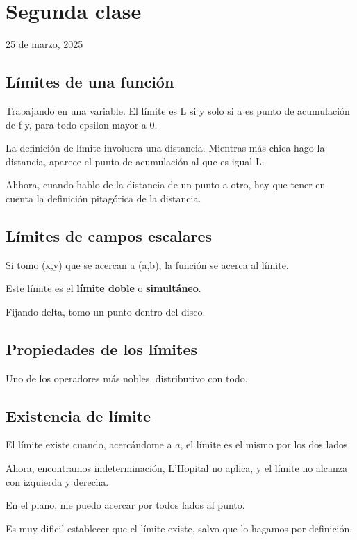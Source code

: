 \section{Segunda clase}

25 de marzo, 2025

\subsection{Límites de una función}

Trabajando en una variable.
El límite es L si y solo si a es punto de acumulación de f y,
para todo epsilon mayor a 0.

La definición de límite involucra una distancia.
Mientras más chica hago la distancia,
aparece el punto de acumulación al que es igual L.

Ahhora, cuando hablo de la distancia de un punto a otro, hay que tener en cuenta la definición pitagórica de la distancia.

\subsection{Límites de campos escalares}

Si tomo (x,y) que se acercan a (a,b),
la función se acerca al límite.

Este límite es el \textbf{límite doble} o \textbf{simultáneo}.

Fijando delta,
tomo un punto dentro del disco.

\subsection{Propiedades de los límites}

Uno de los operadores más nobles, distributivo con todo.

\subsection{Existencia de límite}

El límite existe cuando, acercándome a \(a\),
el límite es el mismo por los dos lados.

Ahora, encontramos indeterminación,
L'Hopital no aplica,
y el límite no alcanza con izquierda y derecha.

En el plano,
me puedo acercar por todos lados al punto.

Es muy dificil establecer que el límite existe,
salvo que lo hagamos por definición.

